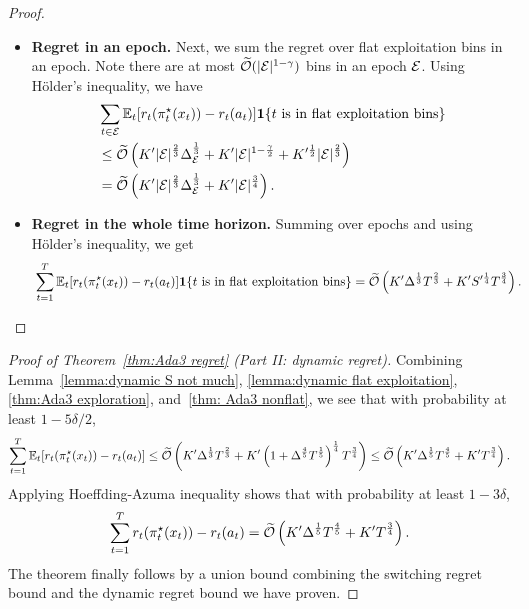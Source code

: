 \begin{proof}
\begin{itemize}[leftmargin=*]
\item \textbf{Regret in an epoch. }
Next, we sum the regret over flat exploitation bins in an epoch. Note there are at most $\widetilde{\mathcal{O}}(\lvert{\mathcal{E}}\rvert^{1-\gamma})$ bins in an epoch ${\mathcal{E}}$. Using H\"{o}lder's inequality, we have
\begin{align*}
&\sum_{t\in {\mathcal{E}}} \mathbb{E}_t[r_t(\pi_t^\star(x_t))-r_t(a_t)]\boldsymbol{1}\{t \text{ is in flat exploitation bins}\}\\
&\leq \widetilde{\mathcal{O}}\left(K^{\prime} \lvert{\mathcal{E}}\rvert^{\frac{2}{3}}\Delta_{\mathcal{E}}^{\frac{1}{3}} + K^{\prime } \lvert{\mathcal{E}}\rvert^{1-\frac{\gamma}{2}}  + K^{\prime\frac{1}{2}} \lvert{\mathcal{E}}\rvert^{\frac{2}{3}} \right) \\
&= \widetilde{\mathcal{O}}\left(K^{\prime} \lvert{\mathcal{E}}\rvert^{\frac{2}{3}}\Delta_{\mathcal{E}}^{\frac{1}{3}} + K^{\prime } \lvert{\mathcal{E}}\rvert^{\frac{3}{4}} \right).
\end{align*}

\item \textbf{Regret in the whole time horizon. }
Summing over epochs and using H\"{o}lder's inequality, we get 
\begin{align*}
&\sum_{t=1}^T \mathbb{E}_t[r_t(\pi_t^\star(x_t))-r_t(a_t)]\boldsymbol{1}\{t \text{ is in flat exploitation bins}\}=\widetilde{\mathcal{O}}\left(K^{\prime}\Delta^{\frac{1}{3}}T^{\frac{2}{3}} + K^\prime S^{\prime \frac{1}{4}}T^{\frac{3}{4}} \right). 
\end{align*}

\end{itemize}
\end{proof}

\begin{proof}[Proof of Theorem~\ref{thm:Ada3 regret} (Part II: dynamic regret)]
Combining Lemma~\ref{lemma:dynamic S not much}, \ref{lemma:dynamic flat exploitation}, \ref{thm:Ada3 exploration}, and~\ref{thm: Ada3 nonflat}, we see that with probability at least $1-5\delta/2$, 
\begin{align*}
\sum_{t=1}^T \mathbb{E}_t[r_t(\pi^\star_t(x_t)) - r_t(a_t)]\leq \widetilde{\mathcal{O}}\left(K'\Delta^{\frac{1}{3}}T^{\frac{2}{3}}  + K^\prime\left(1+\Delta^{\frac{4}{5}}T^{\frac{1}{5}}\right)^{\frac{1}{4}} T^{\frac{3}{4}}\right)\leq \widetilde{\mathcal{O}}\left(K'\Delta^{\frac{1}{5}}T^{\frac{4}{5}}  + K^\prime T^{\frac{3}{4}}\right). 
\end{align*}
Applying Hoeffding-Azuma inequality shows that with probability at least $1-3\delta$, 
\[
\sum_{t=1}^T r_t(\pi^\star_t(x_t)) - r_t(a_t) = \widetilde{\mathcal{O}}\left(K'\Delta^{\frac{1}{5}}T^{\frac{4}{5}}  + K^\prime T^{\frac{3}{4}}\right).
\]
The theorem finally follows by a union bound combining the switching regret bound and the dynamic regret bound we have proven.
\end{proof}
